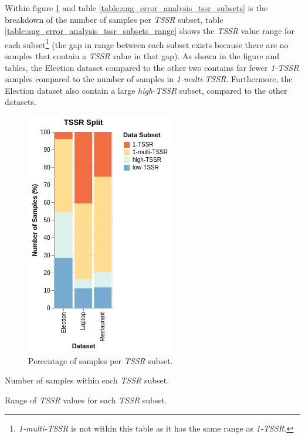 Within figure \ref{fig:aug_error_analysis_tssr_subsets} and table \ref{table:aug_error_analysis_tssr_subsets} is the breakdown of the number of samples per \textit{TSSR} subset, table \ref{table:aug_error_analysis_tssr_subsets_range} shows the \textit{TSSR} value range for each subset\footnote{\textit{1-multi-TSSR} is not within this table as it has the same range as \textit{1-TSSR}.} (the gap in range between each subset exists because there are no samples that contain a \textit{TSSR} value in that gap). As shown in the figure and tables, the Election dataset compared to the other two contains far fewer \textit{1-TSSR} samples compared to the number of samples in \textit{1-multi-TSSR}. Furthermore, the Election dataset also contain a large \textit{high-TSSR} subset, compared to the other datasets. 

\begin{figure}[!ht]
    \centering
    \includegraphics[scale=0.5]{images/augmentation/error_analysis/tssr_subsets.png}
    \caption{Percentage of samples per \textit{TSSR} subset.}
    \label{fig:aug_error_analysis_tssr_subsets}
\end{figure}

\begin{table}[!ht]
    \centering
    
    \caption{Number of samples within each \textit{TSSR} subset.}
    \label{table:aug_error_analysis_tssr_subsets}
\end{table}

\begin{table}[!ht]
    \centering
    
    \caption{Range of \textit{TSSR} values for each \textit{TSSR} subset.}
    \label{table:aug_error_analysis_tssr_subsets_range}
\end{table}

